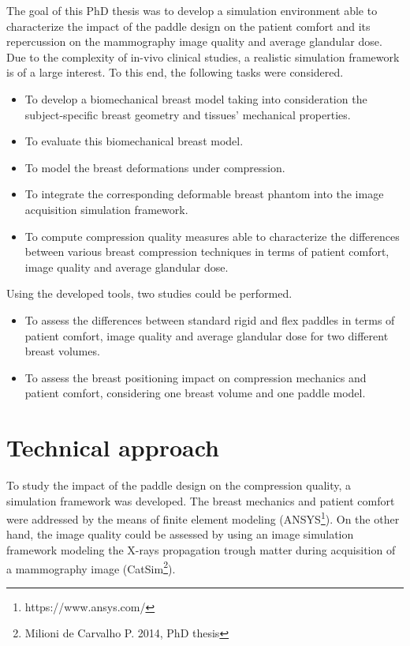 The goal of this PhD thesis was to develop a simulation environment able to characterize the impact of the paddle design on the patient comfort and its repercussion on the mammography image quality and average glandular dose. Due to the complexity of in-vivo clinical studies, a realistic simulation framework is of a large interest. To this end, the following tasks were considered.
\begin{itemize}
\item To develop a biomechanical breast model taking into consideration the subject-specific breast geometry and tissues' mechanical properties. 

\item To evaluate this biomechanical breast model. 

\item To model the breast deformations under compression.

\item To integrate the corresponding deformable breast phantom into the image acquisition simulation framework.
\item To compute compression quality measures able to characterize the differences between various breast compression techniques in terms of patient comfort, image quality and average glandular dose.  

\end{itemize}   

Using the developed tools, two studies could be performed.
\begin{itemize}
\item To assess the differences between standard rigid and flex paddles in terms of patient comfort, image quality and average glandular dose for two different breast volumes.

\item To assess the breast positioning impact on compression mechanics and patient comfort, considering one breast volume and one paddle model.
\end{itemize}
 
\cleardoublepage
\chapter*{Technical approach}\label{section:technicalapproach}

To study the impact of the paddle design on the compression quality, a simulation framework was developed.  The breast mechanics and patient comfort were addressed by the means of finite element modeling (ANSYS\footnote{https://www.ansys.com/}). On the other hand, the image quality could be assessed by using an image simulation framework modeling the X-rays propagation trough matter during acquisition of a mammography image (CatSim\footnote{Milioni de Carvalho P. 2014, PhD thesis}). 

